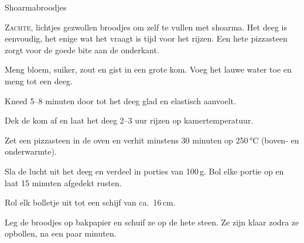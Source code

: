 \begin{recipe}{Shoarmabroodjes}
\label{recipe:shoarmabroodjes}


\lettrine{Z}{achte,} lichtjes gezwollen broodjes om zelf te vullen met shoarma.
Het deeg is eenvoudig, het enige wat het vraagt is tijd voor het rijzen.
Een hete pizzasteen zorgt voor de goede bite aan de onderkant.

\begin{ingredients}
\end{ingredients}

\begin{steps}
  \item Meng bloem, suiker, zout en gist in een grote kom. Voeg het lauwe water
        toe en meng tot een deeg.
  \item Kneed 5–8 minuten door tot het deeg glad en elastisch aanvoelt.
  \item Dek de kom af en laat het deeg 2–3 uur rijzen op kamertemperatuur.
  \item Zet een pizzasteen in de oven en verhit minstens 30 minuten op 250\,°C
        (boven- en onderwarmte).
  \item Sla de lucht uit het deeg en verdeel in porties van 100\,g. Bol elke
        portie op en laat 15 minuten afgedekt rusten.
  \item Rol elk bolletje uit tot een schijf van ca.\ 16\,cm.
  \item Leg de broodjes op bakpapier en schuif ze op de hete steen. Ze zijn
        klaar zodra ze opbollen, na een paar minuten.
\end{steps}
\end{recipe}

